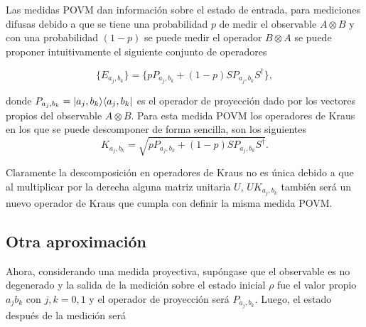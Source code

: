 Las medidas POVM dan información sobre el estado de entrada, para mediciones difusas debido a que se tiene una probabilidad $p$ de medir el observable $A\otimes B$ y con una probabilidad $(1-p)$ se puede medir el operador $B\otimes A$ se puede proponer intuitivamente el siguiente conjunto de operadores

\begin{equation}\{E_{a_j, b_k}\}= \{p P_{a_j,b_k}+(1-p)SP_{a_j,b_k}S^\dagger\},\end{equation}

donde $P_{a_j,b_k} = |a_j, b_k\rangle \langle a_j,b_k|$ es el operador de proyección dado por los vectores propios del observable $A\otimes B$. Para esta medida POVM los operadores de Kraus en los que se puede descomponer de forma sencilla, son los siguientes 
\begin{equation}
K_{a_j, b_k}= \sqrt{p P_{a_j,b_k}+(1-p)SP_{a_j,b_k}S^\dagger}.
\end{equation}

Claramente la descomposición en operadores de Kraus no es única debido a que al multiplicar por la derecha alguna matriz unitaria $U$, $UK_{a_j,b_k}$ también será un nuevo operador de Kraus que cumpla con definir la misma medida POVM\@.



    


\subsection{Otra aproximación}
    Ahora, considerando una medida proyectiva, supóngase que el observable es no degenerado y la salida de la medición sobre el estado inicial $\rho $ fue el valor propio $a_j b_k$ con $j,k=0,1$ y el operador de proyección será $P_{a_j,b_k}$. Luego, el estado después de la medición será 
    
